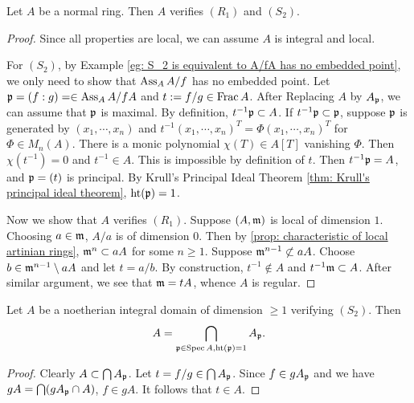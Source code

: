     \begin{lemma}\label{lem: normal rings verify R_1 and S_2}
        Let $A$ be a normal ring.
        Then $A$ verifies $(R_1)$ and $(S_2)$.
    \end{lemma}
    \begin{proof}
        Since all properties are local, we can assume $A$ is integral and local.

        For $(S_2)$, by Example \ref{eg: S_2 is equivalent to A/fA has no embedded point}, we only need to show that $\operatorname{Ass}_A A/f$ has no embedded point.
        Let ${\mathfrak{p}} = (f:g) = \in \operatorname{Ass}_A A/fA$ and $t:= f/g \in \operatorname{Frac} A$.
        After Replacing $A$ by $A_{\mathfrak{p}}$, we can assume that ${\mathfrak{p}}$ is maximal.
        By definition, $t^{-1}{\mathfrak{p}} \subset A$.
        If $t^{-1}{\mathfrak{p}} \subset {\mathfrak{p}}$, suppose ${\mathfrak{p}}$ is generated by $(x_1,\cdots,x_n)$ and $t^{-1}(x_1,\cdots,x_n)^T = \Phi(x_1,\cdots,x_n)^T$ for $\Phi \in M_n(A)$.
        There is a monic polynomial $\chi(T) \in A[T]$ vanishing $\Phi$.
        Then $\chi(t^{-1}) = 0$ and $t^{-1} \in A$.
        This is impossible by definition of $t$.
        Then $t^{-1}{\mathfrak{p}} = A$, and ${\mathfrak{p}} = (t)$ is principal. 
        By Krull's Principal Ideal Theorem \ref{thm: Krull's principal ideal theorem}, $\operatorname{ht}({\mathfrak{p}}) = 1$.

        Now we show that $A$ verifies $(R_1)$.
        Suppose $(A, {\mathfrak{m}})$ is local of dimension $1$.
        Choosing $a \in {\mathfrak{m}}$, $A/a$ is of dimension $0$.
        Then by \ref{prop: characteristic of local artinian rings}, ${\mathfrak{m}}^n \subset aA$ for some $n\geq 1$.
        Suppose ${\mathfrak{m}}^{n-1} \not\subset aA$.
        Choose $b \in {\mathfrak{m}}^{n-1} \setminus aA$ and let $t = a/b$.
        By construction, $t^{-1} \notin A$ and $t^{-1}{\mathfrak{m}} \subset A$.
        After similar argument, we see that ${\mathfrak{m}} = tA$, whence $A$ is regular.
    \end{proof}

    \begin{proposition}
        Let $A$ be a noetherian integral domain of dimension $\geq 1$ verifying $(S_2)$.
        Then 
        \[ A = \bigcap_{{\mathfrak{p}} \in \operatorname{Spec} A, \operatorname{ht}({\mathfrak{p}}) = 1} A_{\mathfrak{p}}. \]
    \end{proposition}
    \begin{proof}
        Clearly $A \subset \bigcap A_{\mathfrak{p}}$.
        Let $t = f/g \in \bigcap A_{\mathfrak{p}}$.
        Since $f\in gA_{\mathfrak{p}}$ and we have $g A = \bigcap (gA_{\mathfrak{p}} \cap A)$, $f \in gA$.
        It follows that $t \in A$.
    \end{proof}

